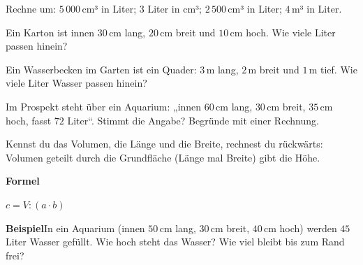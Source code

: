 \documentclass[11pt]{article}
\makeatletter
\newcommand{\aufg}[3]{\par\noindent\makebox[0pt][r]{#3}\begin{minipage}[t]{\linewidth}#1\end{minipage}\par}
\newcommand{\nr}[1]{\makebox[7mm][l]{\textbf{#1}}}
\newlength{\kr}
\newcommand{\karomerk}[2]{\protected@write\@auxout{}{\string\karoseite{#1}{#2}{\thepage}}}
\newcommand{\karoseite}[3]{\expandafter\xdef\csname karo@#1@#2\endcsname{#3}}
\makeatother
\begin{document}
\aufg{\nr{1.}Rechne um: $5\,000$\,cm³ in Liter; \quad $3$ Liter in cm³; \quad $2\,500$\,cm³ in Liter; \quad $4$\,m³ in Liter.}{}{}
\medskip
\aufg{\nr{2.}Ein Karton ist innen $30$\,cm lang, $20$\,cm breit und $10$\,cm hoch. Wie viele Liter passen hinein?}{}{}
\medskip
\aufg{\nr{3.}Ein Wasserbecken im Garten ist ein Quader: $3$\,m lang, $2$\,m breit und $1$\,m tief. Wie viele Liter Wasser passen hinein?}{}{}
\medskip
\aufg{\nr{4.}Im Prospekt steht über ein Aquarium: „innen $60$\,cm lang, $30$\,cm breit, $35$\,cm hoch, fasst $72$ Liter“. Stimmt die Angabe? Begründe mit einer Rechnung.}{}{{\scriptsize\color{mbgrau}Ziel\hspace{2mm}}}
\medskip
\par\vspace{3mm}\setlength{\kr}{\dimexpr\pagegoal-\pagetotal-10mm\relax}%
\ifdim\kr>12mm\karomerk{k}{C}\noindent{\scriptsize\color{mbgrau}Platz zum Rechnen}\par\nointerlineskip\vspace{1mm}\noindent
\begin{tikzpicture}\clip (0,0) rectangle ({\linewidth-0.5mm},\kr);\draw[black!16,line width=0.3pt,step=5mm] (0,0) grid (\linewidth,\kr);\end{tikzpicture}\fi\par
\clearpage\label{s:D}\noindent\colorbox{black!12}{}\hspace{3mm}{\Large\bfseries Höhe aus dem Volumen}\par\smallskip
\noindent Kennst du das Volumen, die Länge und die Breite, rechnest du rückwärts: Volumen geteilt durch die Grundfläche (Länge mal Breite) gibt die Höhe.\par\medskip
\noindent\textbf{Formel}\par\nopagebreak\noindent\hspace*{4mm}\begin{minipage}{\dimexpr\linewidth-4mm\relax}$c = V : (a \cdot b)$\end{minipage}\par\medskip
\noindent\textbf{Beispiel}\quad In ein Aquarium (innen $50$\,cm lang, $30$\,cm breit, $40$\,cm hoch) werden $45$ Liter Wasser gefüllt. Wie hoch steht das Wasser? Wie viel bleibt bis zum Rand frei?\par\smallskip
\end{document}
